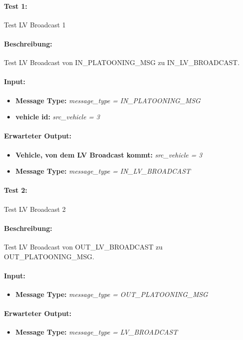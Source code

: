 \documentclass[a4paper, 12pt, titlepage]{scrartcl}
\begin{document}
			\paragraph{Test 1:}{Test LV Broadcast 1
			\paragraph{Beschreibung:} Test LV Broadcast von IN\_PLATOONING\_MSG zu IN\_LV\_BROADCAST.
			\paragraph{Input:}
			\begin{itemize} \itemsep-0.5em
				\item \textbf{Message Type:} \emph{message\_type = IN\_PLATOONING\_MSG}
				\item \textbf{vehicle id:} \emph{src\_vehicle = 3}
			\end{itemize}
			\paragraph{Erwarteter Output:}
			\begin{itemize} \itemsep-0.5em
				\item \textbf{Vehicle, von dem LV Broadcast kommt:} \emph{src\_vehicle = 3}
				\item \textbf{Message Type:} \emph{message\_type = IN\_LV\_BROADCAST}
			\end{itemize}

			\paragraph{Test 2:}{Test LV Broadcast 2}
			\paragraph{Beschreibung:} Test LV Broadcast von OUT\_LV\_BROADCAST zu OUT\_PLATOONING\_MSG.
			\paragraph{Input:}
			\begin{itemize} \itemsep-0.5em
				\item \textbf{Message Type:} \emph{message\_type = OUT\_PLATOONING\_MSG}
			\end{itemize}
			\paragraph{Erwarteter Output:}
			\begin{itemize} \itemsep-0.5em
				\item \textbf{Message Type:} \emph{message\_type = LV\_BROADCAST}
			\end{itemize}

}
\end{document}

